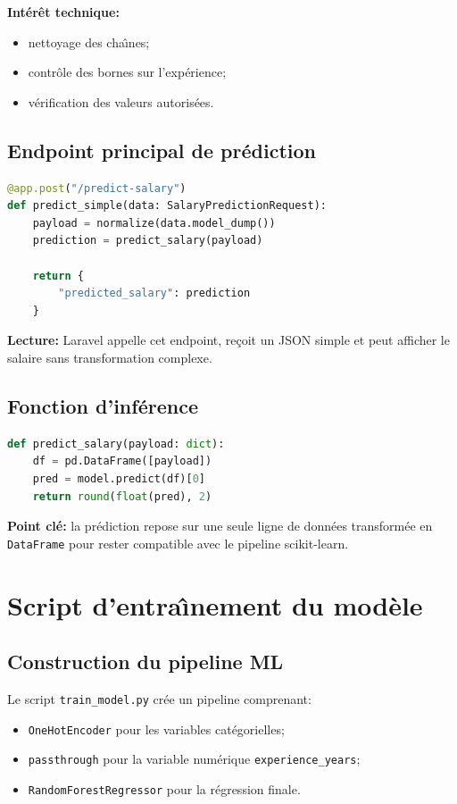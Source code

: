 \documentclass[11pt,a4paper]{article}
\begin{document}
\textbf{Int\'er\^et technique:}
\begin{itemize}[leftmargin=1.2cm]
    \item nettoyage des cha\^\i nes;
    \item contr\^ole des bornes sur l'exp\'erience;
    \item v\'erification des valeurs autoris\'ees.
\end{itemize}

\subsection{Endpoint principal de pr\'ediction}
\begin{lstlisting}[language=Python, caption={Endpoint FastAPI pour Laravel}]
@app.post("/predict-salary")
def predict_simple(data: SalaryPredictionRequest):
    payload = normalize(data.model_dump())
    prediction = predict_salary(payload)

    return {
        "predicted_salary": prediction
    }
\end{lstlisting}

\textbf{Lecture:} Laravel appelle cet endpoint, re\c{c}oit un JSON simple et peut afficher le salaire sans transformation complexe.

\subsection{Fonction d'inf\'erence}
\begin{lstlisting}[language=Python, caption={Inference scikit-learn}]
def predict_salary(payload: dict):
    df = pd.DataFrame([payload])
    pred = model.predict(df)[0]
    return round(float(pred), 2)
\end{lstlisting}

\textbf{Point cl\'e:} la pr\'ediction repose sur une seule ligne de donn\'ees transform\'ee en \texttt{DataFrame} pour rester compatible avec le pipeline scikit-learn.

\section{Script d'entra\^\i nement du mod\`ele}

\subsection{Construction du pipeline ML}
Le script \texttt{train\_model.py} cr\'ee un pipeline comprenant:
\begin{itemize}[leftmargin=1.2cm]
    \item \texttt{OneHotEncoder} pour les variables cat\'egorielles;
    \item \texttt{passthrough} pour la variable num\'erique \texttt{experience\_years};
    \item \texttt{RandomForestRegressor} pour la r\'egression finale.
\end{itemize}
\end{document}
